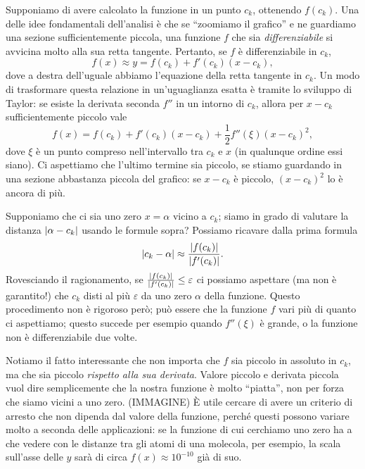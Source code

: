 \documentclass[a4paper]{report}
\DeclarePairedDelimiter{\abs}{\lvert}{\rvert}
\theoremstyle{definiton}
\theoremstyle{remark}
\begin{document}
Supponiamo di avere calcolato la funzione in un punto $c_k$, ottenendo $f(c_k)$. Una delle idee fondamentali dell'analisi è che se ``zoomiamo il grafico'' e ne guardiamo una sezione sufficientemente piccola, una funzione $f$ che sia \emph{differenziabile} si avvicina molto alla sua retta tangente. Pertanto, se $f$ è differenziabile in $c_k$,
\[
    f(x) \approx y = f(c_k) + f'(c_k)(x-c_k),
\]
dove a destra dell'uguale abbiamo l'equazione della retta tangente in $c_k$. Un modo di trasformare questa relazione in un'uguaglianza esatta è tramite lo sviluppo di Taylor: se esiste la derivata seconda $f''$ in un intorno di $c_k$, allora per $x-c_k$ sufficientemente piccolo vale
\[
    f(x) = f(c_k) + f'(c_k)(x-c_k) + \frac{1}{2}f''(\xi) (x-c_k)^2,
\]
dove $\xi$ è un punto compreso nell'intervallo tra $c_k$ e $x$ (in qualunque ordine essi siano). Ci aspettiamo che l'ultimo termine sia piccolo, se stiamo guardando in una sezione abbastanza piccola del grafico: se $x-c_k$ è piccolo, $(x-c_k)^2$ lo è ancora di più.

Supponiamo che ci sia uno zero $x = \alpha$ vicino a $c_k$; siamo in grado di valutare la distanza $\abs{\alpha - c_k}$ usando le formule sopra? Possiamo ricavare dalla prima formula
\[
\abs{c_k-\alpha} \approx \frac{\abs{f(c_k)}}{\abs{f'(c_k)}}.
\]
Rovesciando il ragionamento, se $\frac{\abs{f(c_k)}}{\abs{f'(c_k)}} \leq \varepsilon$ ci possiamo aspettare (ma non è garantito!) che $c_k$ disti al più $\varepsilon$ da uno zero $\alpha$ della funzione. Questo procedimento non è rigoroso però; può essere che la funzione $f$ vari più di quanto ci aspettiamo; questo succede per esempio quando $f''(\xi)$ è grande, o la funzione non è differenziabile due volte.

Notiamo il fatto interessante che non importa che $f$ sia piccolo in assoluto in $c_k$, ma che sia piccolo \emph{rispetto alla sua derivata}. Valore piccolo e derivata piccola vuol dire semplicemente che la nostra funzione è molto ``piatta'', non per forza che siamo vicini a uno zero. (IMMAGINE) È utile cercare di avere un criterio di arresto che non dipenda dal valore della funzione, perché questi possono variare molto a seconda delle applicazioni: se la funzione di cui cerchiamo uno zero ha a che vedere con le distanze tra gli atomi di una molecola, per esempio, la scala sull'asse delle $y$ sarà di circa $f(x) \approx 10^{-10}$ già di suo.
\end{document}
